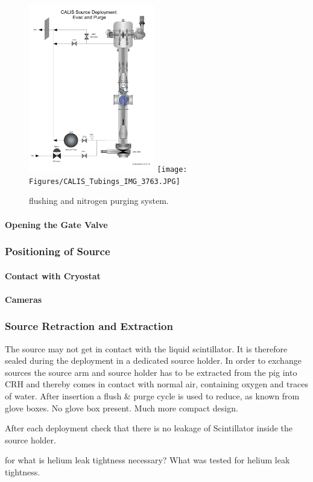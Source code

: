 \begin{figure}[htbp]
 \centering
  \includegraphics[width=0.49\textwidth]{Figures/GasSystem.png}
  \texttt{[image: Figures/CALIS\_Tubings\_IMG\_3763.JPG]}
  \caption{flushing and nitrogen purging system.}
  \label{fig:flushing_purging}
\end{figure}




\paragraph{Opening the Gate Valve}
\subsubsection{Positioning of Source}
\paragraph{Contact with Cryostat}
\paragraph{Cameras}
\subsubsection{Source Retraction and Extraction}
The source may not get in contact with the liquid scintillator. It is therefore sealed during the deployment in a dedicated source holder. In order to exchange sources the source arm and source holder has to be extracted from the pig into CRH and thereby comes in contact with normal air, containing oxygen and traces of water. After insertion a flush \& purge cycle is used to reduce, as known from glove boxes. No glove box present. Much more compact design.

After each deployment check that there is no leakage of Scintillator inside the source holder.



for what is helium leak tightness necessary? What was tested for helium leak tightness.




